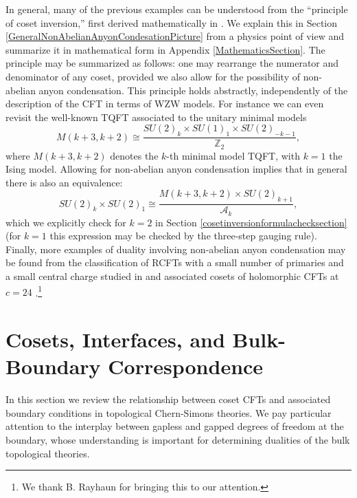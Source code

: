 \documentclass[11pt]{article}
\numberwithin{equation}{section}
\renewcommand{\thefootnote}{\fnsymbol{footnote}}
\begin{document}
In general, many of the previous examples can be understood from the ``principle of coset inversion,'' first derived mathematically in \cite{Frohlich:2003hm}. We explain this in Section \ref{GeneralNonAbelianAnyonCondesationPicture} from a physics point of view and summarize it in mathematical form in Appendix \ref{MathematicsSection}. The principle may be summarized as follows: one may rearrange the numerator and denominator of any coset, provided we also allow for the possibility of non-abelian anyon condensation. This principle holds abstractly, independently of the description of the CFT in terms of WZW models.  For instance we can even revisit the well-known TQFT associated to the unitary minimal models
\begin{equation}    
M(k+3,k+2) \cong \frac{SU(2)_{k} \times SU(1)_{1} \times SU(2)_{-k-1}}{\mathbb{Z}_{2}},
\end{equation}
where $M(k+3,k+2)$ denotes the $k$-th minimal model TQFT, with $k=1$ the Ising model. Allowing for non-abelian anyon condensation implies that in general there is also an equivalence:
\begin{equation} 
    SU(2)_{k} \times SU(2)_{1} \cong \frac{M(k+3,k+2) \times SU(2)_{k+1}}{\mathcal{A}_{k}},
\end{equation}
which we explicitly check for $k=2$ in Section \ref{cosetinversionformulachecksection} (for $k=1$ this expression may be checked by the three-step gauging rule). Finally, more examples of duality involving non-abelian anyon condensation may be found from the classification of RCFTs with a small number of primaries and a small central charge studied in \cite{Mukhi:2022bte, Rayhaun:2023pgc} and associated cosets of holomorphic CFTs at $c=24$ \cite{Schellekens:1992db}.\renewcommand{\thefootnote}{\arabic{footnote}}\footnote{We thank B. Rayhaun for bringing this to our attention.}



\section{Cosets, Interfaces, and Bulk-Boundary Correspondence} \label{cosetinterfacebulkboundaryreview}





In this section we review the relationship between coset CFTs and associated boundary conditions in topological Chern-Simons theories.  We pay particular attention to the interplay between gapless and gapped degrees of freedom at the boundary, whose understanding is important for determining dualities of the bulk topological theories.
\end{document}
